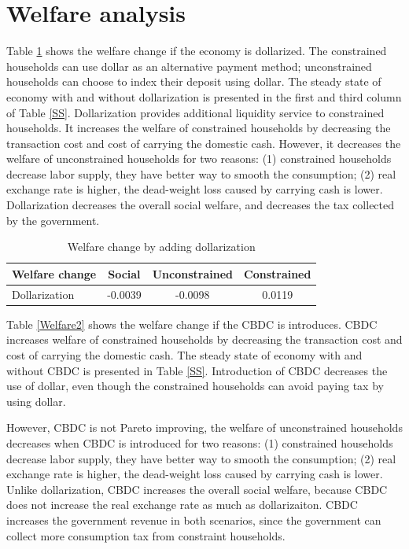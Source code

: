 \documentclass[12pt]{article}
\begin{document}
\section{Welfare analysis}
Table \ref{Welfare1} shows the welfare change if the economy is dollarized. The constrained households can use dollar as an alternative payment method; unconstrained households can choose to index their deposit using dollar. The steady state of economy with and without dollarization is presented in the first and third column of Table \ref{SS}. Dollarization provides additional liquidity service to constrained households. It increases the welfare of constrained households by decreasing the transaction cost and cost of carrying the domestic cash. However, it decreases the welfare of unconstrained households for two reasons:  (1) constrained households decrease labor supply, they have better way to smooth the consumption; (2) real exchange rate is higher, the dead-weight loss caused by carrying cash is lower. Dollarization decreases the overall social welfare, and decreases the tax collected by the government. 
\begin{table}[h!]
\centering
\begin{tabular}{lccc}
\hline\hline
Welfare change & Social  & Unconstrained & Constrained  \\\hline
Dollarization &  -0.0039  & -0.0098  &  0.0119 \\\hline        
\end{tabular}
\caption{Welfare change by adding dollarization}
\label{Welfare1}
\end{table}

Table \ref{Welfare2} shows the welfare change if the CBDC is introduces. CBDC increases welfare of constrained households by decreasing the transaction cost and cost of carrying the domestic cash. The steady state of economy with and without CBDC is presented in Table \ref{SS}. Introduction of CBDC decreases the use of dollar, even though the constrained households can avoid paying tax by using dollar. 

However, CBDC is not Pareto improving, the welfare of unconstrained households decreases when CBDC is introduced for two reasons:   (1) constrained households decrease labor supply, they have better way to smooth the consumption; (2) real exchange rate is higher, the dead-weight loss caused by carrying cash is lower. Unlike dollarization, CBDC increases the overall social welfare, because CBDC does not increase the real exchange rate as much as dollarizaiton. CBDC increases the government revenue in both scenarios, since the government can collect more consumption tax from constraint households. 
\end{document}
